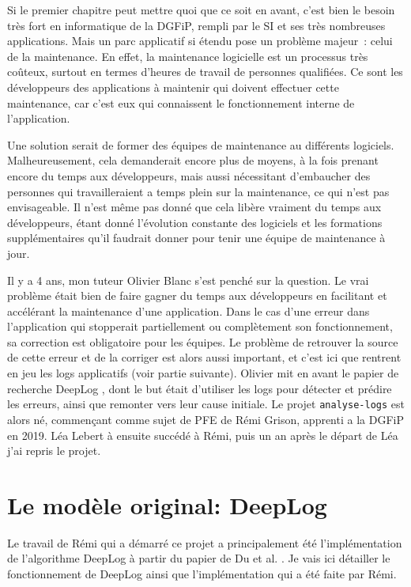 \documentclass[openany, 11pt]{memoir}
\begin{document}
Si le premier chapitre peut mettre quoi que ce soit en avant, c'est bien le besoin très fort en informatique de la \gls{DGFiP}, rempli par le \gls{SI} et ses très nombreuses applications. Mais un parc applicatif si étendu pose un problème majeur~: celui de la maintenance. En effet, la maintenance logicielle est un processus très coûteux, surtout en termes d'heures de travail de personnes qualifiées. Ce sont les développeurs des applications à maintenir qui doivent effectuer cette maintenance, car c'est eux qui connaissent le fonctionnement interne de l'application.

Une solution serait de former des équipes de maintenance au différents logiciels. Malheureusement, cela demanderait encore plus de moyens, à la fois prenant encore du temps aux développeurs, mais aussi nécessitant d'embaucher des personnes qui travailleraient a temps plein sur la maintenance, ce qui n'est pas envisageable. Il n'est même pas donné que cela libère vraiment du temps aux développeurs, étant donné l'évolution constante des logiciels et les formations supplémentaires qu'il faudrait donner pour tenir une équipe de maintenance à jour.

\bigskip
Il y a 4 ans, mon tuteur Olivier Blanc s'est penché sur la question. Le vrai problème était bien de faire gagner du temps aux développeurs en facilitant et accélérant la maintenance d'une application. Dans le cas d'une erreur dans l'application qui stopperait partiellement ou complètement son fonctionnement, sa correction est obligatoire pour les équipes. Le problème de retrouver la source de cette erreur et de la corriger est alors aussi important, et c'est ici que rentrent en jeu les \glspl{log} applicatifs (voir partie suivante). Olivier mit en avant le papier de recherche DeepLog \cite{deeplog}, dont le but était d'utiliser les logs pour détecter et prédire les erreurs, ainsi que remonter vers leur cause initiale. Le projet \texttt{analyse-logs} est alors né, commençant comme sujet de PFE de Rémi Grison, apprenti a la DGFiP en 2019. Léa Lebert à ensuite succédé à Rémi, puis un an après le départ de Léa j'ai repris le projet.

\section{Le modèle original: DeepLog}

Le travail de Rémi qui a démarré ce projet a principalement été l'implémentation de l'algorithme DeepLog à partir du papier de Du et al. \cite{deeplog}. Je vais ici détailler le fonctionnement de DeepLog ainsi que l'implémentation qui a été faite par Rémi.
\end{document}
